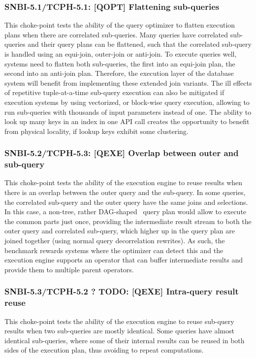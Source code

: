 \subsubsection{SNBI-5.1/TCPH-5.1: [QOPT]  Flattening sub-queries}
\label{choke_point_5.1}
This choke-point tests the ability of the query optimizer to flatten execution plans when there are correlated sub-queries. Many queries have correlated sub-queries and their query plans can be flattened,
such that the correlated sub-query is handled using an equi-join, outer-join or anti-join. To execute queries well, systems need to flatten both sub-queries, the first into an equi-join plan, the second into an anti-join plan.
Therefore, the execution layer of the database system will benefit from implementing these extended join variants.
The ill effects of repetitive tuple-at-a-time sub-query execution can also be mitigated if execution systems by using vectorized, or block-wise query execution, allowing to run sub-queries with thousands of input parameters instead of one.
The ability to look up many keys in an index in one API call creates the opportunity to benefit from physical locality, if lookup keys exhibit some clustering.

\subsubsection{SNBI-5.2/TCPH-5.3: [QEXE] Overlap between outer and sub-query}
\label{choke_point_5.2}
This choke-point tests the ability of the execution engine to reuse results when there is an overlap between the outer query and the sub-query. In some queries, the correlated sub-query and the outer query have the same joins and selections.
In this case, a non-tree, rather DAG-shaped~\cite{DBLP:conf/btw/NeumannM09} query plan would allow to execute the common parts just once, providing the intermediate result stream to both the outer query and correlated sub-query,
which higher up in the query plan are joined together (using normal query decorrelation rewrites).
As such, the benchmark rewards systems where the optimizer can detect this and the execution engine supports an operator that can buffer intermediate results and provide them to multiple parent operators.

\subsubsection{SNBI-5.3/TCPH-5.2 ? TODO: [QEXE] Intra-query result reuse}
\label{choke_point_5.3}
This choke-point tests the ability of the execution engine to reuse sub-query results when two sub-queries are mostly identical.
Some queries have almost identical sub-queries, where some of their internal results can be reused in both sides of the execution plan, thus avoiding to repeat computations.


